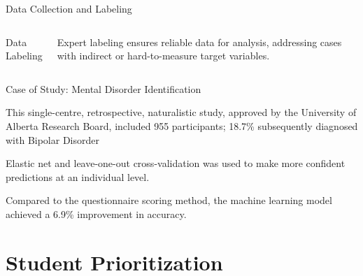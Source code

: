 \documentclass[10pt, xcolor=table]{beamer}
\begin{document}
\begin{frame}{Data Collection and Labeling}
\begin{columns}[c]
			\centering
			Data Labeling \\
			\begin{tcolorbox}[width=\linewidth, colback=myNewColorB, colframe=myNewColorA, boxrule=0.7mm, rounded corners]
				\justifying
				Expert labeling ensures reliable data for analysis, addressing cases with indirect or hard-to-measure target variables.
			\end{tcolorbox}
		\end{columns}
		
		
		
	\end{frame}
	
	
\begin{frame}{Case of Study: Mental Disorder Identification \cite{LIU2021100215}}
	
	
	\begin{tcolorbox}[width=\textwidth, colback=myNewColorB, colframe=myNewColorA, boxrule=0.7mm, rounded corners]
		This single-centre, retrospective, naturalistic study, approved by the University of Alberta Research Board, included 955 participants; 18.7\% subsequently diagnosed with Bipolar Disorder 
	\end{tcolorbox}
	
	\vspace{0.3cm}
	
	\begin{tcolorbox}[width=\textwidth, colback=myNewColorB, colframe=myNewColorA, boxrule=0.7mm, rounded corners]
		Elastic net and leave-one-out cross-validation was used to make more confident predictions at an individual level.
	\end{tcolorbox}
	
	\vspace{0.3cm}
	
	\begin{tcolorbox}[width=\textwidth, colback=myNewColorB, colframe=myNewColorA, boxrule=0.7mm, rounded corners]
		Compared to the questionnaire scoring method, the machine learning model achieved a 6.9\% improvement in accuracy.
	\end{tcolorbox}
	
\end{frame}
	
	
\section*{Student Prioritization}
\end{document}
